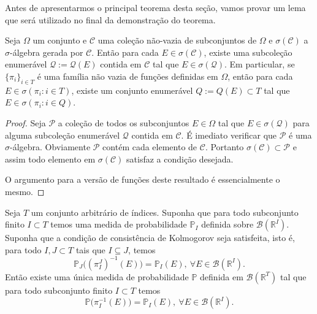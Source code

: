 Antes de apresentarmos o principal teorema desta seção,
vamos provar um lema que será utilizado no final da 
demonstração do teorema.

\begin{lema}\label{lema-aux2-TEK}
Seja $\Omega$ um conjunto e $\mathscr{C}$ uma coleção 
não-vazia de subconjuntos de $\Omega$ e $\sigma(\mathscr{C})$
a $\sigma$-álgebra gerada por $\mathscr{C}$.
Então para cada $E\in \sigma(\mathscr{C})$, existe uma 
subcoleção enumerável $\mathscr{Q}:=\mathscr{Q}(E)$ contida em $\mathscr{C}$ 
tal que $E\in \sigma(\mathscr{Q})$.
Em particular, se $\{\pi_{i}\}_{i\in T}$ é uma família não vazia 
de funções definidas em $\Omega$, então para cada 
$E\in \sigma(\pi_{i}: i\in T)$, existe um conjunto enumerável 
$Q:=Q(E)\subset T$ tal que $E\in \sigma(\pi_{i}: i\in Q)$.
\end{lema}

\begin{proof}
Seja $\mathscr{P}$ a coleção de todos os subconjuntos $E\in \Omega$
tal que $E\in \sigma(\mathscr{Q})$ para alguma subcoleção 
enumerável $\mathscr{Q}$ contida em $\mathscr{C}$.
É imediato verificar que $\mathscr{P}$ é uma 
$\sigma$-álgebra. Obviamente $\mathscr{P}$ contém 
cada elemento de $\mathscr{C}$. Portanto 
$\sigma(\mathscr{C})\subset \mathscr{P}$ e assim 
todo elemento em $\sigma(\mathscr{C})$ satisfaz a 
condição desejada. 

O argumento para a versão de funções deste resultado é essencialmente
o mesmo.
\end{proof}


\begin{teorema}
\label{teo-exist-kolmogorov-nao-enumeravel}
Seja $T$ um conjunto arbitrário de índices. 
Suponha que para todo subconjunto finito $I\subset T$
temos uma medida de probabilidade $\mathbb{P}_{I}$
definida sobre $\mathscr{B}(\mathbb{R}^I)$.
Suponha que a condição de consistência de Kolmogorov 
seja satisfeita, isto é, para todo $I,J\subset T$ 
tais que $I\subseteq J$, temos
\[
\mathbb{P}_{J}\big( (\pi^{J}_{I})^{-1}(E) \big)
=
\mathbb{P}_{I}(E),
\ \forall E\in\mathscr{B}(\mathbb{R}^{I}).
\]
Então existe uma única medida de probabilidade 
$\mathbb{P}$ definida em $\mathscr{B}(\mathbb{R}^T)$ 
tal que para todo subconjunto finito $I\subset T$ temos
\[
\mathbb{P}\big(\pi^{-1}_{I}(E) ) = \mathbb{P}_{I}(E),
\ \forall E\in\mathscr{B}(\mathbb{R}^{I}).
\]
\end{teorema}


